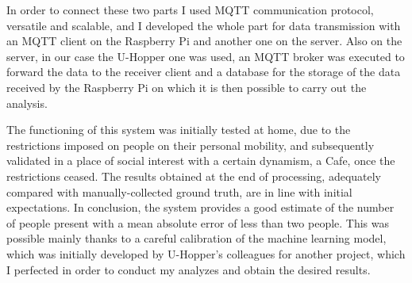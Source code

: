 In order to connect these two parts I used MQTT communication protocol, versatile and scalable, and I developed the whole part for data transmission with an MQTT client on the Raspberry Pi and another one on the server. Also on the server, in our case the U-Hopper one was used, an MQTT broker was executed to forward the data to the receiver client and a database for the storage of the data received by the Raspberry Pi on which it is then possible to carry out the analysis.

The functioning of this system was initially tested at home, due to the restrictions imposed on people on their personal mobility, and subsequently validated in a place of social interest with a certain dynamism, a Cafe, once the restrictions ceased. The results obtained at the end of processing, adequately compared with manually-collected ground truth, are in line with initial expectations. In conclusion, the system provides a good estimate of the number of people present with a mean absolute error of less than two people. This was possible mainly thanks to a careful calibration of the machine learning model, which was initially developed by U-Hopper's colleagues for another project, which I perfected in order to conduct my analyzes and obtain the desired results.
